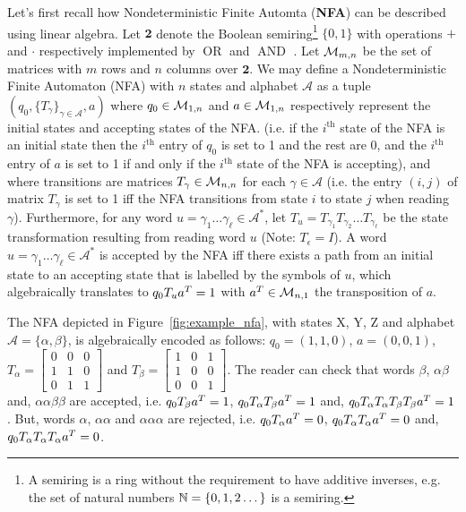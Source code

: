 Let's first recall how Nondeterministic Finite Automta (\textbf{NFA}) can be described using linear algebra. Let $\mathbf{2}$ denote the Boolean semiring\footnote{A semiring is a ring without the requirement to have additive inverses, e.g. the set of natural numbers $\mathbb{N}=\{0,1,2\dots\}$ is a semiring.} $\{0,1\}$ with operations $+$ and $\cdot$ respectively implemented by $\operatorname{OR}$ and $\operatorname{AND}$ \cite{CUNINGHAMEGREEN1991251}.
Let $\mathcal{M}_{m,n}$ be the set of matrices with $m$ rows and $n$ columns over $\mathbf{2}$. We may define a Nondeterministic Finite Automaton (NFA) with $n$ states and alphabet $\mathcal{A}$ as a tuple $(q_0, \{T_\gamma\}_{\gamma \in \mathcal{A}}, a)$ where $q_0 \in \mathcal{M}_{1,n}$ and $a \in \mathcal{M}_{1,n}$ respectively represent the initial states and accepting states of the NFA. (i.e. if the $i^\text{th}$ state of the NFA is an initial state then the $i^\text{th}$ entry of $q_0$ is set to 1 and the rest are 0, and the $i^\text{th}$ entry of $a$ is set to 1 if and only if the $i^\text{th}$ state of the NFA is accepting), and where transitions are matrices $T_\gamma\in \mathcal{M}_{n,n}$ for each $\gamma\in\mathcal{A}$ (i.e. the entry $(i,j)$ of matrix $T_\gamma$ is set to 1 iff the NFA transitions from state $i$ to state $j$ when reading $\gamma$). Furthermore, for any word $u=\gamma_1\dots\gamma_\ell \in \mathcal{A}^*$, let $T_u = T_{\gamma_1} T_{\gamma_2} \dots T_{\gamma_\ell}$ be the state transformation resulting from reading word $u$ (Note: $T_\epsilon = I$). A word $u=\gamma_1\dots\gamma_\ell \in \mathcal{A}^*$ is accepted by the NFA iff there exists a path from an initial state to an accepting state that is labelled by the symbols of $u$, which algebraically translates to $q_0 T_u a^T = 1$ with $a^T \in \mathcal{M}_{n,1}$ the transposition of $a$.



\begin{example}\label{ex:nfa}\normalfont
  The NFA depicted in Figure~\ref{fig:example_nfa}, with states X, Y, Z and alphabet $\mathcal{A}=\{\alpha,\beta\}$, is algebraically encoded as follows: $q_0 = (1,1,0)$, $a=(0,0,1)$, $T_\alpha=\begin{bmatrix}
      0 & 0 & 0 \\
      1 & 1 & 0 \\
      0 & 1 & 1
    \end{bmatrix}$ and $T_\beta= \begin{bmatrix}
      1 & 0 & 1 \\
      1 & 0 & 0 \\
      0 & 0 & 1
    \end{bmatrix}$. The reader can check that words $\beta$, $\alpha\beta$ and, $\alpha\alpha\beta\beta$ are accepted, i.e. $q_0T_\beta a^T = 1$, $q_0T_\alpha T_\beta a^T = 1$ and, $q_0T_\alpha T_\alpha T_\beta T_\beta a ^T = 1$. But, words $\alpha$, $\alpha\alpha$ and $\alpha\alpha\alpha$ are rejected, i.e. $q_0T_\alpha a^T = 0$, $q_0T_\alpha T_\alpha a^T = 0$ and, $q_0T_\alpha T_\alpha T_\alpha a ^T = 0$.
\end{example}


